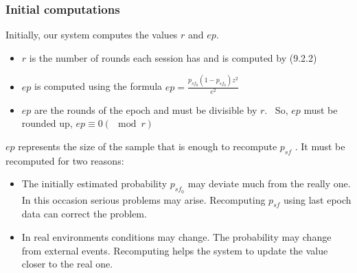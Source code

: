 \documentclass{article}
\begin{document}
\subsubsection{Initial computations}
Initially, our system computes the values $r$ and $ep$.\\
\begin{itemize}
\item $r$ is the number of rounds each session has and is computed by (9.2.2)
\item $ep$ is computed using the formula $ep=\frac{p_{sf_0}(1-p_{sf_0})z^2}{e^2}$\\
\item $ep$ are the rounds of the epoch and must be divisible by $r$. ~So, $ep$ must be rounded up, $ep \equiv 0(\mod r)$
\end{itemize}
$ep$ represents the size of the sample that is enough to recompute $p_{sf}$ . It must be recomputed for two reasons:
\begin{itemize}
\item The initially estimated probability $p_{sf_0}$ may deviate much from the really one. In this occasion serious problems may arise. Recomputing $p_{sf}$ using last epoch data can correct the problem.
\item In real environments conditions may change. The probability may change from external events. Recomputing helps the system to update the value closer to the real one.
\end{itemize}
\end{document}

